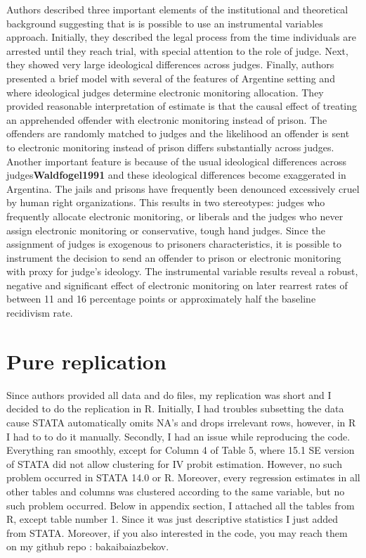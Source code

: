 \documentclass[a4paper,12pt]{article}
\begin{document}
Authors described three important elements of the institutional and theoretical background suggesting that is is possible to use an instrumental variables approach. Initially, they described the legal process from the time individuals are arrested until they reach trial, with special attention to the role of judge. Next, they showed very large ideological differences across judges. Finally, authors presented a brief model with several of the features of Argentine setting and where ideological judges determine electronic monitoring allocation.    
They provided reasonable interpretation of estimate is that the causal effect of treating an apprehended offender with electronic monitoring instead of prison. The offenders are randomly matched to judges and the likelihood an offender is sent to electronic monitoring instead of prison differs substantially across judges. Another important feature is because of the usual ideological differences across judges\textbf{Waldfogel1991}\cite{Waldfogel91} and these ideological differences become exaggerated in Argentina. The jails and prisons have frequently been denounced excessively cruel by human right organizations. This results in two stereotypes: judges who frequently allocate electronic monitoring, or liberals and the judges who never assign electronic monitoring or conservative, tough hand judges. Since the assignment of judges is exogenous to prisoners characteristics, it is possible to instrument the decision to send an offender to prison or electronic monitoring with proxy for judge's ideology. The instrumental variable results reveal a robust, negative and significant effect of electronic monitoring on later rearrest rates of between 11 and 16 percentage points or approximately half the baseline recidivism rate.   




\newpage
\section{Pure replication}
Since authors provided all data and do files, my replication was short and I decided to do the replication in R. Initially, I had troubles subsetting the data cause STATA automatically omits NA's and drops irrelevant rows, however, in R I had to to do it manually. Secondly, I had an issue while  reproducing the code. Everything ran smoothly, except for Column 4 of Table 5, where 15.1 SE version of STATA did not allow clustering for IV probit estimation. However, no such problem occurred in STATA 14.0 or R. Moreover, every regression estimates in all other tables and columns was clustered according to the same variable, but no such problem occurred. Below in appendix section, I attached all the tables  from R, except table number 1. Since it was just descriptive statistics I just added from STATA. Moreover, if you also interested in the code, you may reach them on my github repo : bakaibaiazbekov. 
\end{document}
